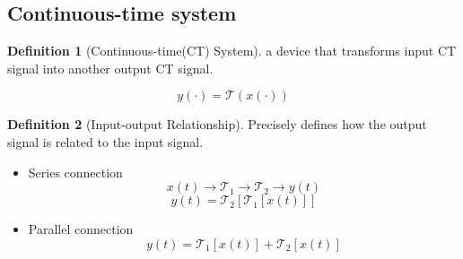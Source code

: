 \documentclass{article}
\theoremstyle{definition}
\newtheorem{definition}{Definition}[subsection]
\begin{document}
\subsection{Continuous-time system}
\begin{definition}[Continuous-time(CT) System]
    a device that transforms input CT signal into another output CT signal.
\end{definition}
\begin{equation}
    y(\cdot) = \mathcal{T}(x(\cdot))
\end{equation}
\begin{definition}[Input-output Relationship]
    Precisely defines how the output signal is related to the input signal.
\end{definition}
\begin{itemize}
    \item Series connection
        \begin{equation}
            x(t)\rightarrow \boxed{\mathcal{T}_1}\rightarrow \boxed{\mathcal{T}_2} \rightarrow y(t)
        \end{equation}
        \begin{equation}
            y(t)=\mathcal{T}_2[\mathcal{T}_1[x(t)]]
        \end{equation}
    \item Parallel connection
        \begin{equation}
            y(t)=\mathcal{T}_1[x(t)]+\mathcal{T}_2[x(t)]
        \end{equation}
\end{itemize}
\end{document}
